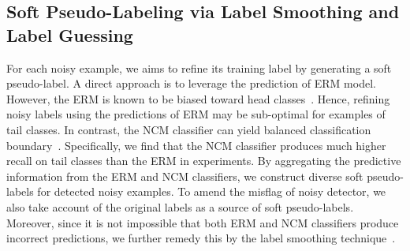 \documentclass{article}
\begin{document}
\subsection{Soft Pseudo-Labeling via Label Smoothing and Label Guessing}
For each noisy example, we aims to refine its training label by generating a soft pseudo-label. A direct approach is to leverage the prediction of ERM model. However, the ERM is known to be biased toward head classes~\cite{DBLP:journals/corr/abs-2104-00466}. Hence, refining noisy labels using the predictions of ERM may be sub-optimal for examples of tail classes. In contrast, the NCM classifier can yield balanced classification boundary~\cite{DBLP:conf/iclr/KangXRYGFK20}. Specifically, we find that the NCM classifier produces much higher recall on tail classes than the ERM in experiments. By aggregating the predictive information from the ERM and NCM classifiers, we construct diverse soft pseudo-labels for detected noisy examples. To amend the misflag of noisy detector, we also take account of the original labels as a source of soft pseudo-labels. Moreover, since it is not impossible that both ERM and NCM classifiers produce incorrect predictions, we further remedy this by the label smoothing technique~\cite{DBLP:journals/corr/abs-2104-00466}.
\end{document}
